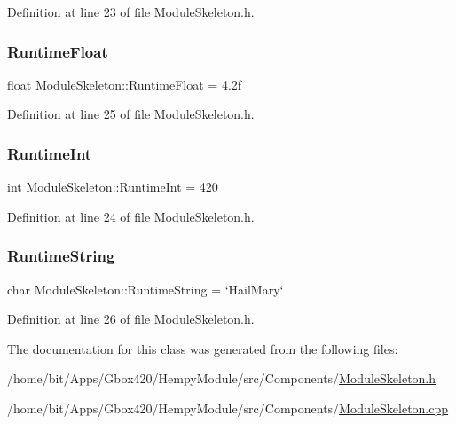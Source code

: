 Definition at line 23 of file Module\+Skeleton.\+h.

\mbox{\label{class_module_skeleton_acb206ae4738d39f94ab7aa9a9c3ebcd3}} 
\subsubsection{\texorpdfstring{Runtime\+Float}{RuntimeFloat}}
{\footnotesize\ttfamily float Module\+Skeleton\+::\+Runtime\+Float = 4.\+2f\hspace{0.3cm}{\ttfamily [protected]}}



Definition at line 25 of file Module\+Skeleton.\+h.

\mbox{\label{class_module_skeleton_a12b393d156b504dfb7c63fe9c5ae359c}} 
\subsubsection{\texorpdfstring{Runtime\+Int}{RuntimeInt}}
{\footnotesize\ttfamily int Module\+Skeleton\+::\+Runtime\+Int = 420\hspace{0.3cm}{\ttfamily [protected]}}



Definition at line 24 of file Module\+Skeleton.\+h.

\mbox{\label{class_module_skeleton_a575b21af4708a8923bef6e894f269790}} 
\subsubsection{\texorpdfstring{Runtime\+String}{RuntimeString}}
{\footnotesize\ttfamily char Module\+Skeleton\+::\+Runtime\+String = \char`\"{}Hail\+Mary\char`\"{}\hspace{0.3cm}{\ttfamily [protected]}}



Definition at line 26 of file Module\+Skeleton.\+h.



The documentation for this class was generated from the following files\+:\begin{DoxyCompactItemize}
\item 
/home/bit/\+Apps/\+Gbox420/\+Hempy\+Module/src/\+Components/\hyperlink{_hempy_module_2src_2_components_2_module_skeleton_8h}{Module\+Skeleton.\+h}\item 
/home/bit/\+Apps/\+Gbox420/\+Hempy\+Module/src/\+Components/\hyperlink{_hempy_module_2src_2_components_2_module_skeleton_8cpp}{Module\+Skeleton.\+cpp}\end{DoxyCompactItemize}
